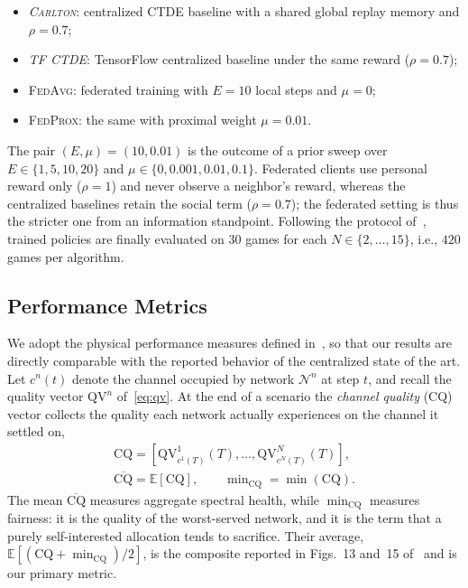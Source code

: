 \documentclass[journal]{IEEEtran}
\newcommand{\CARLTON}{\textsc{Carlton}}
\newcommand{\FedAvg}{\textsc{FedAvg}}
\newcommand{\FedProx}{\textsc{FedProx}}
\begin{document}
\begin{itemize}
\item \emph{\CARLTON{}}: centralized CTDE baseline with a shared global replay
  memory and $\rho=0.7$;
\item \emph{TF CTDE}: TensorFlow centralized baseline under the same reward
  ($\rho=0.7$);
\item \FedAvg{}: federated training with $E=10$ local steps and $\mu=0$;
\item \FedProx{}: the same with proximal weight $\mu=0.01$.
\end{itemize}

The pair $(E,\mu)=(10,0.01)$ is the outcome of a prior sweep over
$E\in\{1,5,10,20\}$ and $\mu\in\{0,0.001,0.01,0.1\}$. Federated clients use
personal reward only ($\rho=1$) and never observe a neighbor's reward, whereas
the centralized baselines retain the social term ($\rho=0.7$); the federated
setting is thus the stricter one from an information standpoint. Following the
protocol of~\cite{cohen2024carlton}, trained policies are finally evaluated on
$30$ games for each $N\in\{2,\dots,15\}$, i.e., $420$ games per algorithm.

\subsection{Performance Metrics}
\label{subsec:exp_metrics}

We adopt the physical performance measures defined
in~\cite{cohen2024carlton}, so that our results are directly comparable with
the reported behavior of the centralized state of the art. Let $c^{n}(t)$
denote the channel occupied by network $\mathcal{N}^{n}$ at step $t$, and
recall the quality vector $\mathrm{QV}^{n}$ of~\eqref{eq:qv}. At the end of a
scenario the \emph{channel quality} (CQ) vector collects the quality each
network actually experiences on the channel it settled on,
\begin{equation}
\begin{gathered}
\mathrm{CQ}=\left[\mathrm{QV}^{1}_{c^{1}(T)}(T),\dots,
\mathrm{QV}^{N}_{c^{N}(T)}(T)\right],\\
\overline{\mathrm{CQ}}=\mathbb{E}[\mathrm{CQ}],\qquad
\min\nolimits_{\mathrm{CQ}}=\min(\mathrm{CQ}).
\end{gathered}
\label{eq:cq}
\end{equation}
The mean $\overline{\mathrm{CQ}}$ measures aggregate spectral health, while
$\min_{\mathrm{CQ}}$ measures fairness: it is the quality of the
worst-served network, and it is the term that a purely self-interested
allocation tends to sacrifice. Their average,
$\mathbb{E}[(\mathrm{CQ}+\min_{\mathrm{CQ}})/2]$, is the composite reported in
Figs.~13 and~15 of~\cite{cohen2024carlton} and is our primary metric.
\end{document}
